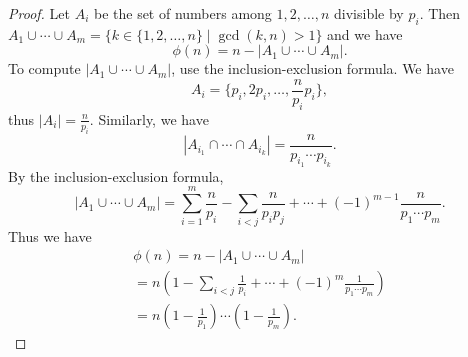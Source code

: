 \begin{proof}
Let $A_i$ be the set of numbers among $1, 2, \ldots, n$ divisible by $p_i$.
Then $A_1 \cup \cdots \cup A_m = \{k \in \{1, 2, \ldots, n\} \mid \gcd(k,n) > 1\}$ and we have
\[
\phi(n) = n - |A_1 \cup \cdots \cup A_m|.
\]
To compute $|A_1 \cup \cdots \cup A_m|$, use the inclusion-exclusion formula.
We have
\[
A_i = \{p_i, 2p_i, \ldots, \frac{n}{p_i} p_i\},
\]
thus $|A_i| = \frac{n}{p_i}$.
Similarly, we have
\[
|A_{i_1} \cap \cdots \cap A_{i_k}| = \frac{n}{p_{i_1} \cdots p_{i_k}}.
\]
By the inclusion-exclusion formula,
\[
|A_1 \cup \cdots \cup A_m| = \sum_{i=1}^m \frac{n}{p_i} - \sum_{i<j} \frac{n}{p_ip_j} + \cdots + (-1)^{m-1} \frac{n}{p_1\cdots p_m}.
\]
Thus we have
\begin{multline*}
\phi(n) = n - |A_1 \cup \cdots \cup A_m|\\
= n \left( 1 - \sum_{i<j} \frac{1}{p_i} + \cdots + (-1)^m \frac{1}{p_1 \cdots p_m} \right)\\
= n \left(1-\frac{1}{p_1}\right) \cdots \left(1-\frac{1}{p_m}\right).
\end{multline*}


\end{proof}



